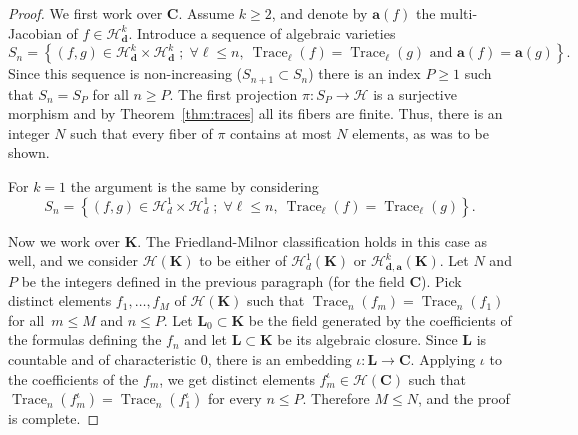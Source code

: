 \documentclass[oneside, 12pt]{amsart}
\newcommand{\set}[1]{\left\{#1\right\}}
\DeclareMathOperator{\Trace}{Trace}
\newcommand{\C}{\mathbf{C}}
\theoremstyle{plain}
\theoremstyle{definition}
\numberwithin{equation}{section}       %
\numberwithin{equation}{section}       %
\begin{document}
\begin{proof}
We first work over $\C$. Assume    $k\geq 2$, and 
denote by $\mathbf a(f)$ the multi-Jacobian of $f\in \mathcal H^k_{\mathbf d}$.  
 Introduce a   sequence of algebraic varieties
$$S_n  = \set{(f,g ) \in \mathcal H^k_{\mathbf d} \times \mathcal H^k_{\mathbf d}\;  ; \; 
 \forall \ell\leq n, \ \Trace_\ell(f)=\Trace_\ell(g) 
 \text{ and } 
\mathbf a(f)= \mathbf a(g) } .$$ Since this sequence is non-increasing ($S_{n+1}\subset S_n$)
there is an index $P\geq 1$ such that $S_n=S_P$ for all $n\geq P$. 
The first projection $\pi\colon S_P\to \mathcal H$ is a surjective morphism and by Theorem~\ref{thm:traces} all its fibers are finite. Thus, there is an integer $N$ such that every fiber of $\pi$ contains at most $N$ elements, as was to be shown. 

For $k=1$ the argument is the same by considering 
$$S_n  = \set{ (f,g) \in \mathcal H_d^1\times \mathcal H_d^1\;  ; \; \forall \ell\leq n, \ 
\Trace_\ell(f)=\Trace_\ell(g)}.$$

Now we work over 
$\mathbf K$.
The Friedland-Milnor classification holds in this case as well, 
and we consider    $\mathcal H (\mathbf K)$ to be either of 
$\mathcal H_d^1(\mathbf K) $ or   ${\mathcal H}_{\mathbf d, \mathbf a}^k(\mathbf K)$.
Let $N$ and $P$ be the integers defined in the previous paragraph (for the field $\C$). 
Pick  distinct elements   $ f_1, \ldots, f_M$ of  $\mathcal H(\mathbf K)$ 
such that $\Trace_n(f_m)=\Trace_n(f_1)$ for all~$m\leq M$ and $n\leq P$. 
Let $\mathbf L_0\subset \mathbf K$ be the 
field generated by the coefficients of the formulas defining the $f_n$
and  let $\mathbf L\subset \mathbf K$ be its algebraic closure. Since $\mathbf L$ is countable and of characteristic $0$, there is an embedding $\iota \colon \mathbf L \to \C$. 
Applying $\iota$ to the coefficients of the $f_m$, we get distinct 
 elements $f_m^\iota \in \mathcal H(\C)$ such that $\Trace_n(f_m^\iota)=\Trace_n(f_1^\iota)$
 for every $n\leq P$. Therefore $M\leq N$, and the proof is complete. 
\end{proof}
\end{document}
